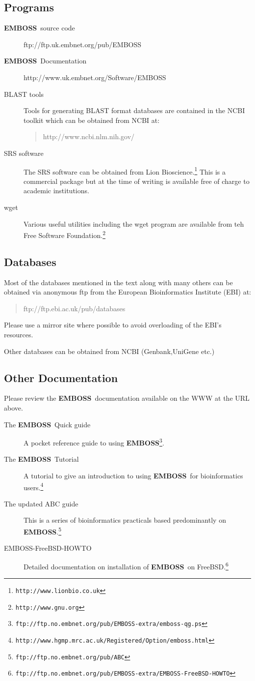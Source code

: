 \documentclass{report}
\newcommand{\progname}[1]{{\sc #1}}
\newcommand{\URL}[1]{\footnote{{\tt #1}}}
\newcommand{\EMBOSS}{{\sf\bfseries EMBOSS}}
\begin{document}
\subsection{Programs}
\begin{description}
\item[\EMBOSS\ source code]ftp://ftp.uk.embnet.org/pub/EMBOSS
\item[\EMBOSS\ Documentation]http://www.uk.embnet.org/Software/EMBOSS
\item[BLAST tools]Tools for generating BLAST format databases are contained in the NCBI toolkit which can be obtained from NCBI at:
\begin{quote}
http://www.ncbi.nlm.nih.gov/
\end{quote}
\item[SRS software]The SRS software can be obtained from Lion Bioscience.\URL{http://www.lionbio.co.uk} This is a commercial package but at the time of writing is available free of charge to academic institutions.
\item[\progname{wget}]Various useful utilities including the \progname{wget} program are available from teh Free Software Foundation.\URL{http://www.gnu.org}
\end{description}
\subsection{Databases}

Most of the databases mentioned in the text along with many others can be obtained via anonymous ftp from the European Bioinformatics Institute (EBI) at:
\begin{quote}
ftp://ftp.ebi.ac.uk/pub/databases
\end{quote}
Please use a mirror site where possible to avoid overloading of the EBI's resources.

Other databases can be obtained from NCBI (Genbank,UniGene etc.)

\subsection{Other Documentation}
Please review the \EMBOSS\ documentation available on the WWW at the URL above.

\begin{description}
\item[The \EMBOSS\ Quick guide]A pocket reference guide to using \EMBOSS\URL{ftp://ftp.no.embnet.org/pub/EMBOSS-extra/emboss-qg.ps}. 
\item[The \EMBOSS\ Tutorial]A tutorial to give an introduction to using \EMBOSS\ for bioinformatics users.\URL{http://www.hgmp.mrc.ac.uk/Registered/Option/emboss.html}
\item[The updated ABC guide]This is a series of bioinformatics practicals based predominantly on \EMBOSS.\URL{ftp://ftp.no.embnet.org/pub/ABC}
\item[EMBOSS-FreeBSD-HOWTO]Detailed documentation on installation of \EMBOSS\ on FreeBSD.\URL{ftp://ftp.no.embnet.org/pub/EMBOSS-extra/EMBOSS-FreeBSD-HOWTO}
\end{description}
\end{document}
